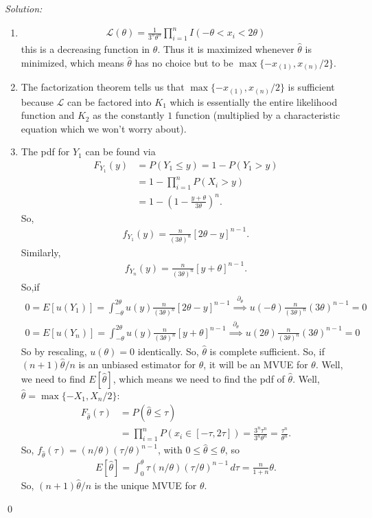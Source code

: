 \documentclass{book}
\theoremstyle{definition}
\newcommand{\p}{\partial}
\newcommand{\lag}{\mathcal{L}}
\newcommand{\nn}{\nonumber}
\newcommand{\f}[2]{\frac{#1}{#2}}
\newcommand{\lp}{\left(}
\newcommand{\rp}{\right)}
\newcommand{\lb}{\left[}
\newcommand{\rb}{\right]}
\begin{document}
\noindent \textit{Solution:} 
\begin{enumerate}
	\item 
	\begin{align*}
	\lag(\theta) = \f{1}{3^n\theta^n}\prod^n_{i=1}I(-\theta < x_i < 2\theta)
	\end{align*}
	this is a decreasing function in $\theta$. Thus it is maximized whenever $\hat\theta$ is minimized, which means $\hat\theta$ has no choice but to be $\max\{-x_{(1)} , x_{(n)}/2 \}$. 
	
	
	\item The factorization theorem tells us that $\max\{-x_{(1)} , x_{(n)}/2 \}$ is sufficient because $\lag$ can be factored into $K_1$ which is essentially the entire likelihood function and $K_2$ as the constantly $1$ function (multiplied by a characteristic equation which we won't worry about). 
	
	
	\item The pdf for $Y_1$ can be found via
	\begin{align}
	F_{Y_1}(y) &= P(Y_1 \leq y) = 1- P(Y_1 > y)\nn\\
	&= 1- \prod^n_{i=1}P(X_i > y)\nn\\
	&= 1- \lp 1 - \f{y + \theta}{3\theta} \rp^n.
	\end{align}
	So, 
	\begin{align}
	f_{Y_1}(y) = \f{n}{(3\theta)^n}\lb 2\theta - y  \rb^{n-1}.
	\end{align}
	Similarly, 
	\begin{align}
	f_{Y_n}(y) = \f{n}{(3\theta)^n}\lb y  + \theta \rb^{n-1}.
	\end{align}
	So,if 
	\begin{align}
	0= E[u(Y_1)] = \int^{2\theta}_{-\theta}u(y)\f{n}{(3\theta)^n}\lb 2\theta - y  \rb^{n-1}  \stackrel{\p_\theta}{\implies} u(-\theta)\f{n}{(3\theta)^n}(3\theta)^{n-1} = 0
	\end{align}
	\begin{align}
	0= E[u(Y_n)] = \int^{2\theta}_{-\theta}u(y)\f{n}{(3\theta)^n}\lb y + \theta  \rb^{n-1}  \stackrel{\p_\theta}{\implies} u(2\theta)\f{n}{(3\theta)^n}(3\theta)^{n-1} = 0
	\end{align}
	So by rescaling, $u(\theta) = 0$ identically. So, $\hat\theta$ is complete sufficient. So, if $(n+1)\hat\theta/n$ is an unbiased estimator for $\theta$, it will be an MVUE for $\theta$. Well, we need to find $E[\hat\theta]$, which means we need to find the pdf of $\hat\theta$. Well, $\hat\theta = \max\{-X_{1}, X_n/2 \}$:
	\begin{align}
	F_{\hat\theta}(\tau) &= P(\hat\theta \leq \tau)\nn\\
	&= \prod^n_{i=1} P(x_i\in [-\tau,2\tau]) = \f{3^n\tau^n}{3^n\theta^n} = \f{\tau^n}{\theta^n}.
	\end{align}
	So, $f_{\hat\theta}(\tau) = (n/\theta)(\tau/\theta)^{n-1}$, with $0 \leq \hat\theta \leq \theta$, so
	\begin{align}
	E[\hat\theta] = \int^\theta_0 \tau (n/\theta) (\tau/\theta)^{n-1}\,d\tau = \f{n}{1+n}\theta.
	\end{align}
	So, $(n+1)\hat\theta/n$ is the unique MVUE for $\theta$. 
	
	
\end{enumerate}\qed
\end{document}
